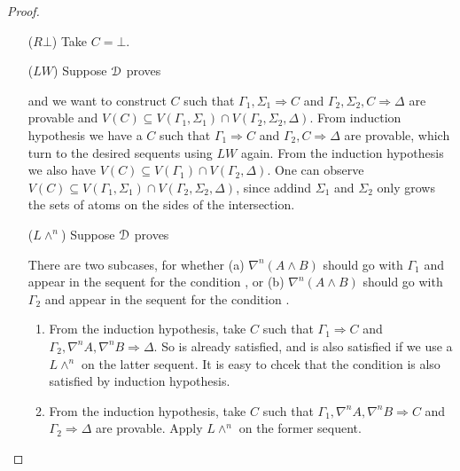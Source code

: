 \begin{proof}
\begin{enumerate}
	\item[($R \bot$)] Take $C = \bot$.
	
	\item[($LW$)] Suppose $\D$ proves
	\begin{prooftree}
  \end{prooftree}
  and we want to construct $C$ such that $\Gamma_1, \Sigma_1 \Rightarrow C$ and $\Gamma_2, \Sigma_2, C \Rightarrow \Delta$ are provable and $V(C) \subseteq V(\Gamma_1, \Sigma_1) \cap V(\Gamma_2, \Sigma_2,\Delta)$. From induction hypothesis we have a $C$ such that $\Gamma_1 \Rightarrow C$ and $\Gamma_2 , C \Rightarrow \Delta$ are provable, which turn to the desired sequents using $LW$ again. From the induction hypothesis we also have $V(C) \subseteq V(\Gamma_1) \cap V(\Gamma_2, \Delta)$. One can observe $V(C) \subseteq V(\Gamma_1, \Sigma_1) \cap V(\Gamma_2, \Sigma_2, \Delta)$, since addind $\Sigma_1$ and $\Sigma_2$ only grows the sets of atoms on the sides of the intersection.

	\item[($L \wedge ^n$)] Suppose $\D$ proves
  \begin{prooftree}
  \end{prooftree}
  There are two subcases, for whether (a) $\nabla^n (A \wedge B)$ should go with $\Gamma_1$ and appear in the sequent for the condition \1, or (b) $\nabla^n (A \wedge B)$  should go with $\Gamma_2$ and appear in the sequent for the condition \2.
	\begin{enumerate}
		\item From the induction hypothesis, take $C$ such that $\Gamma_1 \Rightarrow C$ and $\Gamma_2, \nabla^n A, \nabla^n B \Rightarrow \Delta$. So \1 is already satisfied, and \2 is also satisfied if we use a $L \wedge ^n$ on the latter sequent. It is easy to chcek that the condition \3 is also satisfied by induction hypothesis.

		\item From the induction hypothesis, take $C$ such that $\Gamma_1 , \nabla^n A, \nabla^n B \Rightarrow C$ and $\Gamma_2 \Rightarrow \Delta$ are provable. Apply $L \wedge ^n$ on the former sequent.
	\end{enumerate}


\end{enumerate}
\end{proof}
